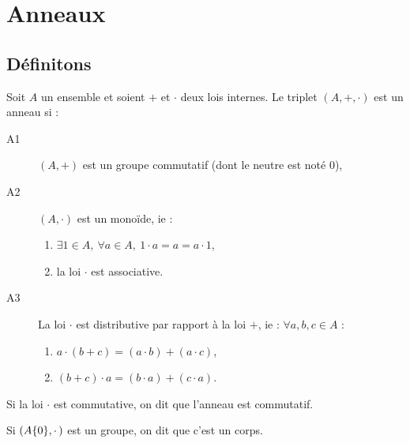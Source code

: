 \section{Anneaux}
\vspace{0.5em}

\subsection{Définitons}
\vspace{0.5em}

\begin{defi}[Anneau]

 Soit $A$ un ensemble et soient $+$ et $\cdotp$ deux lois internes. Le triplet
$(A,+,\cdotp)$ est un anneau si :
\begin{description}
 \item [A1] $(A,+)$ est un groupe commutatif (dont le neutre est noté $0$),
 \item [A2] $(A,\cdotp)$ est un monoïde, ie :
       \begin{enumerate}
        \item $\exists 1 \in A,\ \forall a\in A,\ 1\cdotp a = a = a \cdotp 1$,
        \item la loi $\cdotp$ est associative. 
       \end{enumerate}
 \item [A3] La loi $\cdotp$ est distributive par rapport à la loi $+$, ie :
$\forall
a,b,c \in A$ :
       \begin{enumerate}
       \item $a \cdotp (b+c) = (a\cdotp b) + (a\cdotp c)$,
       \item $(b+c) \cdotp a = (b\cdotp a) + (c\cdotp a)$.
       \end{enumerate}
\end{description}

Si la loi $\cdotp$ est commutative, on dit que l'anneau est commutatif.

Si $(A\-\{0\}, \cdotp)$ est un groupe, on dit que c'est un corps.
\end{defi}

